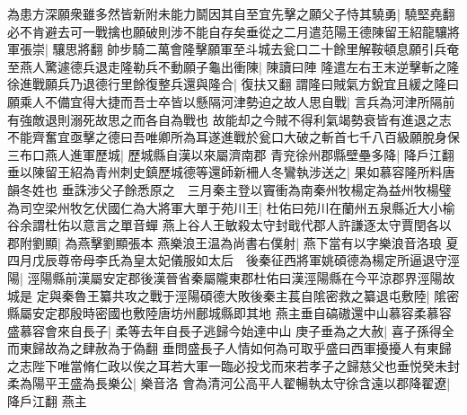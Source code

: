 為患方深願衆雖多然皆新附未能力鬬因其自至宜先擊之願父子恃其驍勇|{
	驍堅堯翻}
必不肯避去可一戰擒也願破則涉不能自存矣垂從之二月遣范陽王德陳留王紹龍驤將軍張崇|{
	驤思將翻}
帥步騎二萬會隆擊願軍至斗城去瓮口二十餘里解鞍頓息願引兵奄至燕人驚遽德兵退走隆勒兵不動願子龜出衝陳|{
	陳讀曰陣}
隆遣左右王末逆擊斬之隆徐進戰願兵乃退德行里餘復整兵還與隆合|{
	復扶又翻}
謂隆曰賊氣方銳宜且緩之隆曰願乘人不備宜得大捷而吾士卒皆以懸隔河津勢迫之故人思自戰|{
	言兵為河津所隔前有強敵退則溺死故思之而各自為戰也}
故能却之今賊不得利氣竭勢衰皆有進退之志不能齊奮宜亟擊之德曰吾唯卿所為耳遂進戰於瓮口大破之斬首七千八百級願脫身保三布口燕人進軍歷城|{
	歷城縣自漢以來屬濟南郡}
青兖徐州郡縣壁壘多降|{
	降戶江翻}
垂以陳留王紹為青州刺史鎮歷城德等還師新柵人冬鸞執涉送之|{
	果如慕容隆所料唐韻冬姓也}
垂誅涉父子餘悉原之　三月秦主登以竇衝為南秦州牧楊定為益州牧楊璧為司空梁州牧乞伏國仁為大將軍大單于苑川王|{
	杜佑曰苑川在蘭州五泉縣近大小榆谷余謂杜佑以意言之單音蟬}
燕上谷人王敏殺太守封戢代郡人許謙逐太守賈閏各以郡附劉顯|{
	為燕擊劉顯張本}
燕樂浪王温為尚書右僕射|{
	燕下當有以字樂浪音洛琅}
夏四月戊辰尊帝母李氏為皇太妃儀服如太后　後秦征西將軍姚碩德為楊定所逼退守涇陽|{
	涇陽縣前漢屬安定郡後漢晉省秦屬隴東郡杜佑曰漢涇陽縣在今平涼郡界涇陽故城是}
定與秦魯王纂共攻之戰于涇陽碩德大敗後秦主萇自隂密救之纂退屯敷陸|{
	隂密縣屬安定郡殷時密國也敷陸唐坊州鄜城縣即其地}
燕主垂自碻磝還中山慕容柔慕容盛慕容會來自長子|{
	柔等去年自長子逃歸今始達中山}
庚子垂為之大赦|{
	喜子孫得全而東歸故為之肆赦為于偽翻}
垂問盛長子人情如何為可取乎盛曰西軍擾擾人有東歸之志陛下唯當脩仁政以俟之耳若大軍一臨必投戈而來若孝子之歸慈父也垂悦癸未封柔為陽平王盛為長樂公|{
	樂音洛}
會為清河公高平人翟暢執太守徐含遠以郡降翟遼|{
	降戶江翻}
燕主

